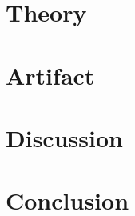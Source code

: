 \documentclass[preprint,12pt]{elsarticle}
\begin{document}
\section{Theory}
\label{sec:theory}

\section{Artifact}
\label{sec:artifact}

\section{Discussion}
\label{sec:discussion}

\section{Conclusion}
\label{sec:conclusion}




\appendix




  
%  





\end{document}
